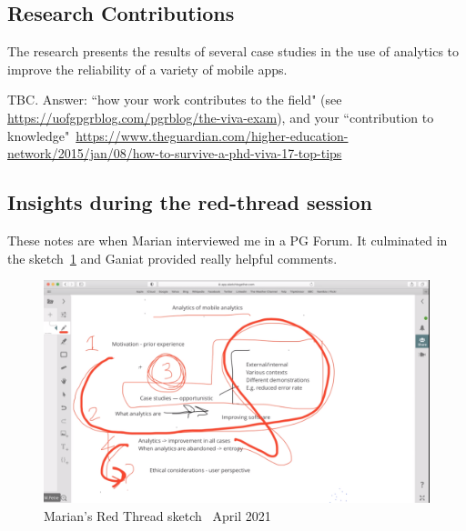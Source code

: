\subsection{Research Contributions}
The research presents the results of several case studies in the use of analytics to improve the reliability of a variety of mobile apps.

TBC. Answer: ``how your work contributes to the field" (see \url{https://uofgpgrblog.com/pgrblog/the-viva-exam}), and your ``contribution to knowledge"~\url{https://www.theguardian.com/higher-education-network/2015/jan/08/how-to-survive-a-phd-viva-17-top-tips}

\subsection{Insights during the red-thread session}
These notes are when Marian interviewed me in a PG Forum. It culminated in the sketch~\ref{fig:marians-red-thread-2021-04-21c} and Ganiat provided really helpful comments.
\begin{figure}
    \centering
    \includegraphics[width=\textwidth]{images/red-thread-pg-forum/marian-red-thread-2021-04-29c.png}
    \caption{Marian's Red Thread sketch~ April 2021}
    \label{fig:marians-red-thread-2021-04-21c}
\end{figure}

